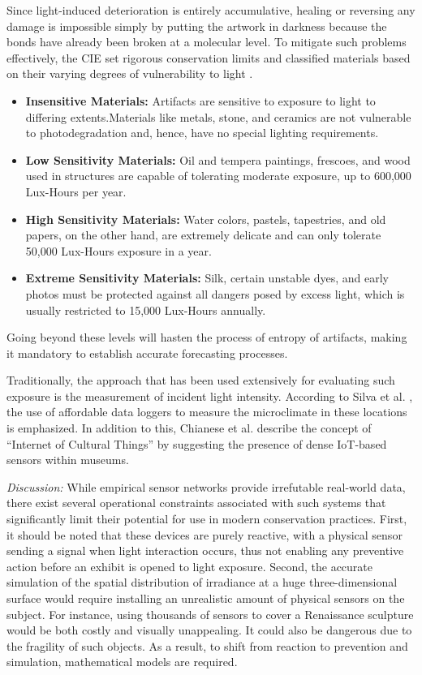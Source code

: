 Since light-induced deterioration is entirely accumulative, healing or reversing any damage is impossible simply by putting the artwork in darkness because the bonds have already been broken at a molecular level. To mitigate such problems effectively, the CIE set rigorous conservation limits and classified materials based on their varying degrees of vulnerability to light \cite{cie2004control}.
\begin{itemize}
    \item \textbf{Insensitive Materials:} Artifacts are sensitive to exposure to light to differing extents.Materials like metals, stone, and ceramics are not vulnerable to photodegradation and, hence, have no special lighting requirements.
    \item \textbf{Low Sensitivity Materials:} Oil and tempera paintings, frescoes, and wood used in structures are capable of tolerating moderate exposure, up to 600,000 Lux-Hours per year.
    \item \textbf{High Sensitivity Materials:} Water colors, pastels, tapestries, and old papers, on the other hand, are extremely delicate and can only tolerate 50,000 Lux-Hours exposure in a year.
    \item \textbf{Extreme Sensitivity Materials:} Silk, certain unstable dyes, and early photos must be protected against all dangers posed by excess light, which is usually restricted to 15,000 Lux-Hours annually.
\end{itemize}
Going beyond these levels will hasten the process of entropy of artifacts, making it mandatory to establish accurate forecasting processes.

Traditionally, the approach that has been used extensively for evaluating such exposure is the measurement of incident light intensity. According to Silva et al. \cite{silva2020climate}, the use of affordable data loggers to measure the microclimate in these locations is emphasized. In addition to this, Chianese et al. \cite{chianese2016internet} describe the concept of “Internet of Cultural Things” by suggesting the presence of dense IoT-based sensors within museums.

\textit{Discussion:} While empirical sensor networks provide irrefutable real-world data, there exist several operational constraints associated with such systems that significantly limit their potential for use in modern conservation practices. First, it should be noted that these devices are purely reactive, with a physical sensor sending a signal when light interaction occurs, thus not enabling any preventive action before an exhibit is opened to light exposure. Second, the accurate simulation of the spatial distribution of irradiance at a huge three-dimensional surface would require installing an unrealistic amount of physical sensors on the subject. For instance, using thousands of sensors to cover a Renaissance sculpture would be both costly and visually unappealing. It could also be dangerous due to the fragility of such objects. As a result, to shift from reaction to prevention and simulation, mathematical models are required.

